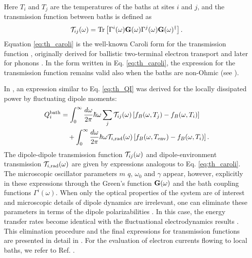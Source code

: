 Here $T_i$ and $T_j$ are the temperatures of the baths at sites $i$ and $j$, and the transmission function between baths is defined as
\begin{equation}
 \mathcal{T}_{ij}(\omega) = \textrm{Tr}\left[\Gamma^i(\omega) \mathbf{G}(\omega) \Gamma^j(\omega) \mathbf{G}(\omega)^{\dagger} \right]. \label{eq:th_caroli}
\end{equation}
Equation \eqref{eq:th_caroli} is the well-known Caroli form for the transmission function \cite{caroli71}, originally derived for ballistic two-terminal electron transport and later for phonons \cite{mingo06,yamamoto06}. In the form written in Eq. \eqref{eq:th_caroli}, the expression for the transmission function remains valid also when the baths are non-Ohmic (see ). 

In , an expression similar to Eq. \eqref{eq:th_QI} was derived for the locally dissipated power by fluctuating dipole moments:
\begin{alignat}{2}
 Q_i^{\textrm{bath}} &= \int_0^{\infty}\frac{d\omega}{2\pi} \hbar\omega \sum_{j} \mathcal{T}_{ij}(\omega) \left[f_B(\omega,T_j)-f_B(\omega,T_i ) \right] \notag \\
  & \quad + \int_0^{\infty} \frac{d\omega}{2\pi} \hbar \omega \mathcal{T}_{i,\textrm{rad}}(\omega)\left[ f_B(\omega,T_{\textrm{env}})-f_B(\omega,T_i)\right].
\end{alignat}
The dipole-dipole transmission function $\mathcal{T}_{ij}(\omega)$ and dipole-environment transmission $\mathcal{T}_{i,\textrm{rad}}(\omega)$ are given by expressions analogous to Eq. \eqref{eq:th_caroli}. The microscopic oscillator parameters $m$ $q$, $\omega_0$ and $\gamma$ appear, however, explicitly in these expressions through the Green's function $\mathbf{G}(\omega)$ and the bath coupling functions $\Gamma^i(\omega)$. When only the optical properties of the system are of interest and microscopic details of dipole dynamics are irrelevant, one can eliminate these parameters in terms of the dipole polarizabilities \cite{rosa10,rosa11}. In this case, the energy transfer rates become identical with the fluctuational electrodynamics results \cite{benabdallah11,messina13}. This elimination procedure and the final expressions for transmission functions are presented in detail in . For the evaluation of electron currents flowing to local baths, we refer to Ref. \cite{roy07}.





